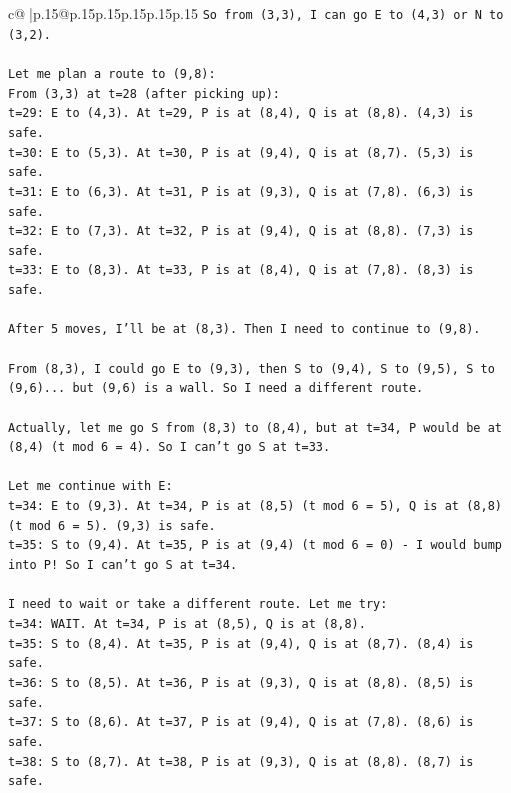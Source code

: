 \documentclass{article}
\begin{document}
{\begin{supertabular}{c@{$\;$}|p{.15\linewidth}@{}p{.15\linewidth}p{.15\linewidth}p{.15\linewidth}p{.15\linewidth}p{.15\linewidth}}
{{{\texttt{So from (3,3), I can go E to (4,3) or N to (3,2).} \\
\\ 
\texttt{Let me plan a route to (9,8):} \\
\texttt{From (3,3) at t=28 (after picking up):} \\
\texttt{t=29: E to (4,3). At t=29, P is at (8,4), Q is at (8,8). (4,3) is safe.} \\
\texttt{t=30: E to (5,3). At t=30, P is at (9,4), Q is at (8,7). (5,3) is safe.} \\
\texttt{t=31: E to (6,3). At t=31, P is at (9,3), Q is at (7,8). (6,3) is safe.} \\
\texttt{t=32: E to (7,3). At t=32, P is at (9,4), Q is at (8,8). (7,3) is safe.} \\
\texttt{t=33: E to (8,3). At t=33, P is at (8,4), Q is at (7,8). (8,3) is safe.} \\
\\ 
\texttt{After 5 moves, I'll be at (8,3). Then I need to continue to (9,8).} \\
\\ 
\texttt{From (8,3), I could go E to (9,3), then S to (9,4), S to (9,5), S to (9,6)... but (9,6) is a wall. So I need a different route.} \\
\\ 
\texttt{Actually, let me go S from (8,3) to (8,4), but at t=34, P would be at (8,4) (t mod 6 = 4). So I can't go S at t=33.} \\
\\ 
\texttt{Let me continue with E:} \\
\texttt{t=34: E to (9,3). At t=34, P is at (8,5) (t mod 6 = 5), Q is at (8,8) (t mod 6 = 5). (9,3) is safe.} \\
\texttt{t=35: S to (9,4). At t=35, P is at (9,4) (t mod 6 = 0) {-} I would bump into P! So I can't go S at t=34.} \\
\\ 
\texttt{I need to wait or take a different route. Let me try:} \\
\texttt{t=34: WAIT. At t=34, P is at (8,5), Q is at (8,8).} \\
\texttt{t=35: S to (8,4). At t=35, P is at (9,4), Q is at (8,7). (8,4) is safe.} \\
\texttt{t=36: S to (8,5). At t=36, P is at (9,3), Q is at (8,8). (8,5) is safe.} \\
\texttt{t=37: S to (8,6). At t=37, P is at (9,4), Q is at (7,8). (8,6) is safe.} \\
\texttt{t=38: S to (8,7). At t=38, P is at (9,3), Q is at (8,8). (8,7) is safe.} \\
}}}
\end{supertabular}}
\end{document}
